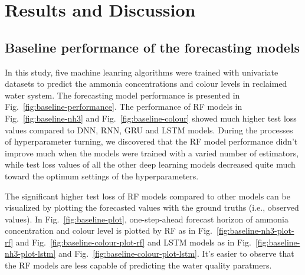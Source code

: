 \chapter{Results and Discussion}
\section{Baseline performance of the forecasting models}
In this study, five machine leanring algorithms were trained with univariate datasets to predict the ammonia concentrations and colour levels in reclaimed water system. The forecasting model performance is presented in Fig.~\ref{fig:baseline-performance}. The performance of RF models in Fig.~\ref{fig:baseline-nh3} and Fig.~\ref{fig:baseline-colour} showed much higher test loss values compared to DNN, RNN, GRU and LSTM models. During the processes of hyperparameter turning, we discovered that the RF model performance didn't improve much when the models were trained with a varied number of estimators, while test loss values of all the other deep learning models decreased quite much toward the optimum settings of the hyperparameters.

The significant higher test loss of RF models compared to other models can be visualized by plotting the forecasted values with the ground truths (i.e., observed values). In Fig.~\ref{fig:baseline-plot}, one-step-ahead forecast horizon of ammonia concentration and colour level is plotted by RF as in Fig.~\ref{fig:baseline-nh3-plot-rf} and Fig.~\ref{fig:baseline-colour-plot-rf} and LSTM models as in Fig.~\ref{fig:baseline-nh3-plot-lstm} and Fig.~\ref{fig:baseline-colour-plot-lstm}. It's easier to observe that the RF models are less capable of predicting the water quality paratmers. 

